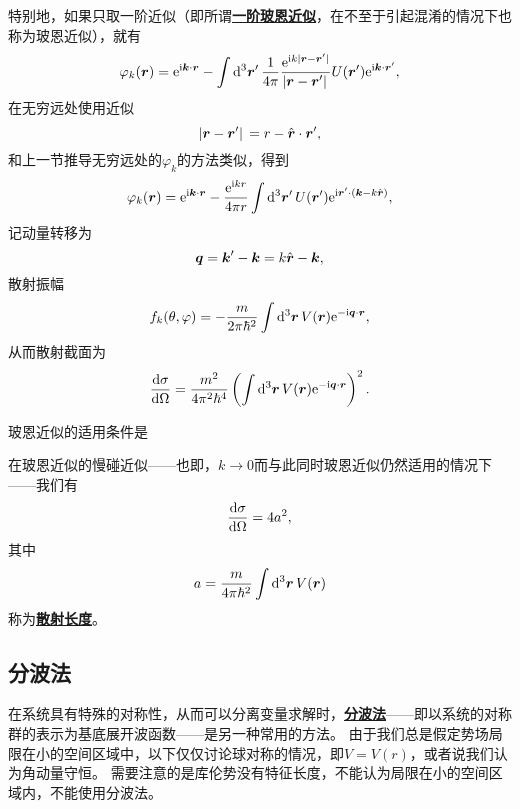 \documentclass[UTF8, a4paper]{ctexart}
\newcommand*{\ee}{\mathrm{e}}
\newcommand*{\ii}{\mathrm{i}}
\newcommand{\concept}[1]{\underline{\textbf{#1}}}
\begin{document}
特别地，如果只取一阶近似（即所谓\concept{一阶玻恩近似}，在不至于引起混淆的情况下也称为玻恩近似），就有
\begin{equation}
    \varphi_k(\vb*{r}) = \ee^{\ii \vb*{k} \cdot \vb*{r}} - \int \dd[3]{\vb*{r}'} \frac{1}{4\pi} \frac{\ee^{\ii k \abs*{\vb*{r} - \vb*{r}'}}}{\abs*{\vb*{r} - \vb*{r}'}} U(\vb*{r}') \ee^{\ii \vb*{k} \cdot \vb*{r}'},
\end{equation}
在无穷远处使用近似
\[
    \abs*{\vb*{r}-\vb*{r}'} = r - \hat{\vb*{r}} \cdot \vb*{r}',
\]
和上一节推导无穷远处的$\varphi_k$的方法类似，得到
\[
    \varphi_k(\vb*{r}) = \ee^{\ii \vb*{k} \cdot \vb*{r}} - \frac{\ee^{\ii k r}}{4 \pi r} \int \dd[3]{\vb*{r}'} U(\vb*{r}') \ee^{\ii \vb*{r}' \cdot (\vb*{k} - k \hat{\vb*{r}})},
\]
记动量转移为
\begin{equation}
    \vb*{q} = \vb*{k}' - \vb*{k} = k \hat{\vb*{r}} - \vb*{k},
\end{equation}
散射振幅
\begin{equation}
    f_k(\theta, \varphi) = - \frac{m}{2\pi \hbar^2} \int \dd[3]{\vb*{r}} V(\vb*{r}) \ee^{- \ii \vb*{q} \cdot \vb*{r}}, 
\end{equation}
从而散射截面为
\begin{equation}
    \dv{\sigma}{\Omega} = \frac{m^2}{4\pi^2 \hbar^4} \left( \int \dd[3]{\vb*{r}} V(\vb*{r}) \ee^{- \ii \vb*{q} \cdot \vb*{r}} \right)^2.
\end{equation}

玻恩近似的适用条件是

在玻恩近似的慢碰近似——也即，$k \to 0$而与此同时玻恩近似仍然适用的情况下——我们有
\begin{equation}
    \dv{\sigma}{\Omega} = 4 a^2,
\end{equation}
其中
\begin{equation}
    a = \frac{m}{4\pi \hbar^2} \int \dd[3]{\vb*{r}} V(\vb*{r})
\end{equation}
称为\concept{散射长度}。

\subsection{分波法}

在系统具有特殊的对称性，从而可以分离变量求解时，\concept{分波法}——即以系统的对称群的表示为基底展开波函数——是另一种常用的方法。
由于我们总是假定势场局限在小的空间区域中，以下仅仅讨论球对称的情况，即$V = V(r)$，或者说我们认为角动量守恒。
需要注意的是库伦势没有特征长度，不能认为局限在小的空间区域内，不能使用分波法。
\end{document}
